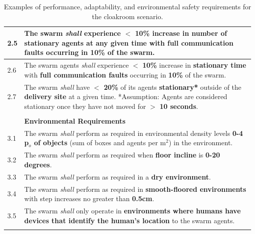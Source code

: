 \documentclass[runningheads]{llncs}
\begin{document}
\begin{table}[!t]
\begin{tabular}{p{5mm} p{120mm} }
		\hline
		2.5 & The swarm \emph{shall} experience $<$ \textbf{10\%} increase in \textbf{number of stationary agents} at any given time with \textbf{full communication faults} occurring in \textbf{10\%} of the swarm.\\
		\hline
		2.6 & The swarm agents \emph{shall} experience $<$ \textbf{10\%} increase in \textbf{stationary time} with \textbf{full communication faults} occurring in \textbf{10\%} of the swarm. \\	
		\hline
		2.7 & The swarm \emph{shall} have \textbf{$<$ 20\%} of its agents \textbf{stationary*} outside of the \textbf{delivery site} at a given time.
		*Assumption: Agents are considered stationary once they have not moved for $>$ \textbf{10 seconds}. \\ 
        \hline \\[-1.25\medskipamount]
	    & \textbf{Environmental Requirements} \\ 
		\hline
		3.1 & The swarm \emph{shall} perform as required in environmental density levels \textbf{0-4 p$_o$ of objects} (sum of boxes and agents per m$^2$) in the environment. %
		\\ 
		\hline
		3.2 & The swarm \emph{shall} perform as required when \textbf{floor incline} is \textbf{0-20 degrees}.
		\\ 
		\hline
		3.3 & The swarm \emph{shall} perform as required in a \textbf{dry environment}.
		\\ 
		\hline
		3.4 & The swarm \emph{shall} perform as required in \textbf{smooth-floored environments} with step increases no greater than \textbf{0.5cm}.
		\\ 
		\hline
		3.5 & The swarm \emph{shall} only operate in \textbf{environments where humans have devices that identify the human’s location} to the swarm agents. 
		\\ 		
		\hline \\[-1\medskipamount]
	\end{tabular}
	\caption{\label{tab:reqs}Examples of performance, adaptability, and environmental safety requirements for the cloakroom scenario.}
	\vspace{-4ex}%
\end{table}
\end{document}

